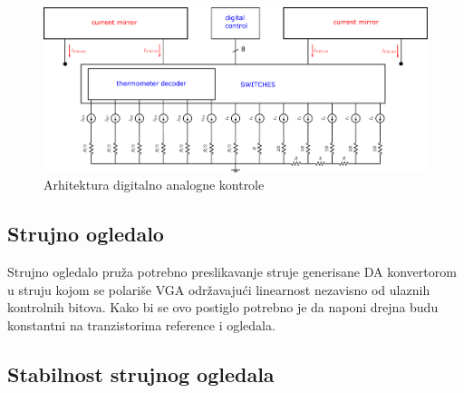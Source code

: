 \documentclass[journal,twocolumn,letterpaper]{IEEEJERM}
\begin{document}







\begin{figure}[!htbp]
  \centering
  \includegraphics[width=\linewidth]{dac_core.pdf}
  \caption{Arhitektura digitalno analogne kontrole}
  \label{fig:dac_core}
\end{figure}

\subsection{Strujno ogledalo}

Strujno ogledalo pruža potrebno preslikavanje struje generisane DA konvertorom u struju kojom se polariše VGA održavajući linearnost nezavisno od ulaznih kontrolnih bitova. Kako bi se ovo postiglo potrebno je da naponi drejna budu konstantni na tranzistorima reference i ogledala. \\

\subsection{Stabilnost strujnog ogledala}
\end{document}
